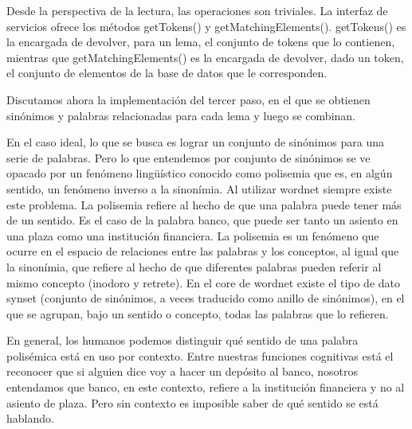 Desde la perspectiva de la lectura, las operaciones son triviales. La interfaz de servicios ofrece los métodos getTokens() y getMatchingElements(). getTokens() es la encargada de devolver, para un lema, el conjunto de tokens que lo contienen, mientras que getMatchingElements() es la encargada de devolver, dado un token, el conjunto de elementos de la base de datos que le corresponden.

Discutamos ahora la implementación del tercer paso, en el que se obtienen sinónimos y palabras relacionadas para cada lema y luego se combinan.

En el caso ideal, lo que se busca es lograr un conjunto de sinónimos para una serie de palabras. Pero lo que entendemos por conjunto de sinónimos se ve opacado por un fenómeno lingüístico conocido como polisemia que es, en algún sentido, un fenómeno inverso a la sinonímia. Al utilizar wordnet siempre existe este problema. La polisemia refiere al hecho de que una palabra puede tener más de un sentido. Es el caso de la palabra banco, que puede ser tanto un asiento en una plaza como una institución financiera. La polisemia es un fenómeno que ocurre en el espacio de relaciones entre las palabras y los conceptos, al igual que la sinonímia, que refiere al hecho de que diferentes palabras pueden referir al mismo concepto (inodoro y retrete). En el core de wordnet existe el tipo de dato synset (conjunto de sinónimos, a veces traducido como anillo de sinónimos), en el que se agrupan, bajo un sentido o concepto, todas las palabras que lo refieren.

En general, los humanos podemos distinguir qué sentido de una palabra polisémica está en uso por contexto. Entre nuestras funciones cognitivas está el reconocer que si alguien dice voy a hacer un depósito al banco, nosotros entendamos que banco, en este contexto, refiere a la institución financiera y no al asiento de plaza. Pero sin contexto es imposible saber de qué sentido se está hablando.

